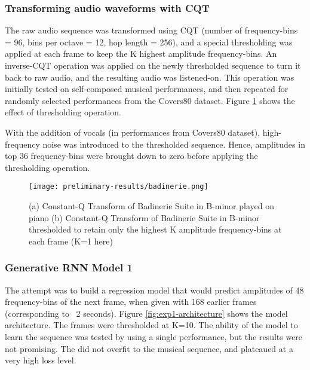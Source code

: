 \documentclass[../main.tex]{subfiles}
\begin{document}
\subsubsection{Transforming audio waveforms with CQT}

\par
The raw audio sequence was transformed using \gls{CQT} (number of frequency-bins = 96, bins per octave = 12, hop length = 256), and a special thresholding was applied at each frame to keep the K highest amplitude frequency-bins. An inverse-\gls{CQT} operation was applied on the newly thresholded sequence to turn it back to raw audio, and the resulting audio was listened-on. This operation was initially tested on self-composed musical performances, and then repeated for randomly selected performances from the Covers80 dataset. Figure \ref{fig:badinerie} shows the effect of thresholding operation.

\par
With the addition of vocals (in performances from Covers80 dataset), high-frequency noise was introduced to the thresholded sequence. Hence, amplitudes in top 36 frequency-bins were brought down to zero before applying the thresholding operation.

\begin{figure}[h]
    \centering
    \texttt{[image: preliminary-results/badinerie.png]}
    \caption{(a) Constant-Q Transform of Badinerie Suite in B-minor played on piano (b) Constant-Q Transform of Badinerie Suite in B-minor thresholded to retain only the highest K amplitude frequency-bins at each frame (K=1 here) }
    \label{fig:badinerie}
\end{figure}

\iffalse
\begin{figure}[h]
    \centering
    \texttt{[image: preliminary-results/c-major-scale.png]}
    \caption{Constant-Q Transform of ascending and descending the C-major scale, thresholded to retain only the highest K amplitude frequency-bins at each frame (K=1 here) }
    \label{fig:c-major-scale}
\end{figure}
\fi



\subsubsection{Generative RNN Model 1}

\par
The attempt was to build a regression model that would predict amplitudes of 48 frequency-bins of the next frame, when given with 168 earlier frames (corresponding to ~2 seconds). Figure \ref{fig:exp1-architecture} shows the model architecture. The frames were thresholded at K=10. The ability of the model to learn the sequence was tested by using a single performance, but the results were not promising. The did not overfit to the musical sequence, and plateaued at a very high loss level.
\end{document}
